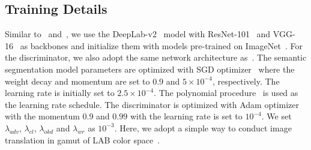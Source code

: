 \subsection{Training Details}
Similar to~\cite{tsai2018learning} and~\cite{vu2019advent}, we use the DeepLab-v2~\cite{chen2017deeplab} model with ResNet-101~\cite{he2016deep} and VGG-16~\cite{simonyan2014very} as backbones and initialize them with models pre-trained on ImageNet~\cite{deng2009imagenet}. For the discriminator, we also adopt the same network architecture as~\cite{tsai2018learning,vu2019advent}. The semantic segmentation model parameters are optimized with SGD optimizer~\cite{bottou2010large} where the weight decay and momentum are set
to 0.9 and $5\times10^{-4}$, respectively. The learning rate is initially set to $2.5 \times 10^{-4}$. The polynomial procedure~\cite{chen2017deeplab} is used as the learning rate schedule. The discriminator is optimized with Adam optimizer~\cite{kingma2014adam} with the momentum $0.9$ and $0.99$ with the learning rate is set to $10^{-4}$. We set $\lambda_{adv}$, $\lambda_{cl}$, $\lambda_{okd}$ and $\lambda_{wr}$ as $10^{-3}$. Here, we adopt a simple way to conduct image translation in gamut of LAB color space~\cite{reinhard2001color}.

